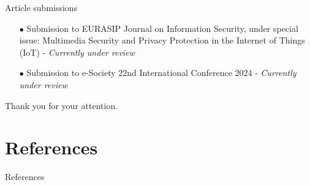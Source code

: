\documentclass[xcolor={svgnames},compress,aspectratio=169]{beamer}
\begin{document}

\begin{frame}{Article submissions}
    \begin{itemize}
        \item[$\bullet$]
        Submission to EURASIP Journal on Information Security, under special issue: Multimedia
        Security and Privacy Protection in the Internet of Things (IoT) - \textit{Currently under review}
        \item[$\bullet$]
        Submission to e-Society 22nd International Conference 2024 - \textit{Currently under review}
    \end{itemize}
\end{frame}


\begin{frame}
    \begin{center}
        {\large Thank you for your attention.}
    \end{center}
\end{frame}

\section*{References}

\begin{frame}[allowframebreaks]{References}
    
    
\end{frame}
\end{document}
